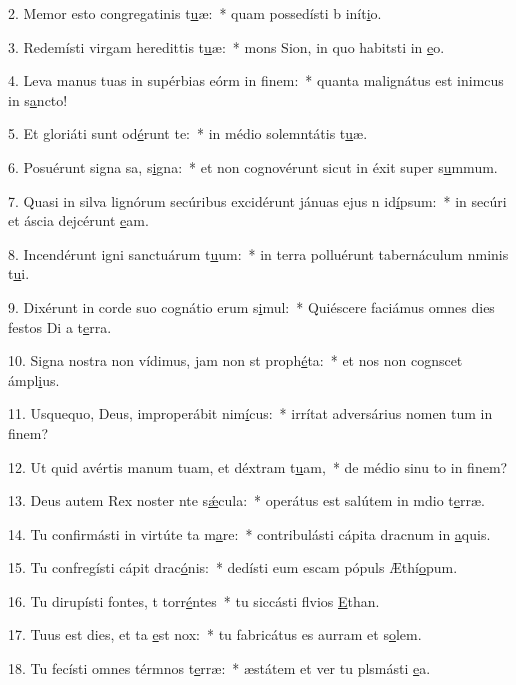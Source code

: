 2. Memor esto congregatinis t\uline{u}æ:~* quam possedísti b inít\uline{i}o.\par 
3. Redemísti virgam heredittis t\uline{u}æ:~* mons Sion, in quo habitsti in \uline{e}o.\par 
4. Leva manus tuas in supérbias eórm in f\uline{i}nem:~* quanta malignátus est inimcus in s\uline{a}ncto!\par 
5. Et gloriáti sunt  od\uline{é}runt te:~* in médio solemntátis t\uline{u}æ.\par 
6. Posuérunt signa sa, s\uline{i}gna:~* et non cognovérunt sicut in éxit super s\uline{u}mmum.\par 
7. Quasi in silva lignórum secúribus excidérunt jánuas ejus n id\uline{í}psum:~* in secúri et áscia dejcérunt \uline{e}am.\par 
8. Incendérunt igni sanctuárum t\uline{u}um:~* in terra polluérunt tabernáculum nminis t\uline{u}i.\par 
9. Dixérunt in corde suo cognátio erum s\uline{i}mul:~* Quiéscere faciámus omnes dies festos Di a t\uline{e}rra.\par 
10. Signa nostra non vídimus, jam non st proph\uline{é}ta:~* et nos non cognscet ámpl\uline{i}us.\par 
11. Usquequo, Deus, improperábit nim\uline{í}cus:~* irrítat adversárius nomen tum in f\uline{i}nem?\par 
12. Ut quid avértis manum tuam, et déxtram t\uline{u}am,~* de médio sinu to in f\uline{i}nem?\par 
13. Deus autem Rex noster nte s\uline{ǽ}cula:~* operátus est salútem in mdio t\uline{e}rræ.\par 
14. Tu confirmásti in virtúte ta m\uline{a}re:~* contribulásti cápita dracnum in \uline{a}quis.\par 
15. Tu confregísti cápit drac\uline{ó}nis:~* dedísti eum escam pópuls Æthí\uline{o}pum.\par 
16. Tu dirupísti fontes, t torr\uline{é}ntes~* tu siccásti flvios \uline{E}than.\par 
17. Tuus est dies, et ta \uline{e}st nox:~* tu fabricátus es aurram et s\uline{o}lem.\par 
18. Tu fecísti omnes térmnos t\uline{e}rræ:~* æstátem et ver tu plsmásti \uline{e}a.\par 
